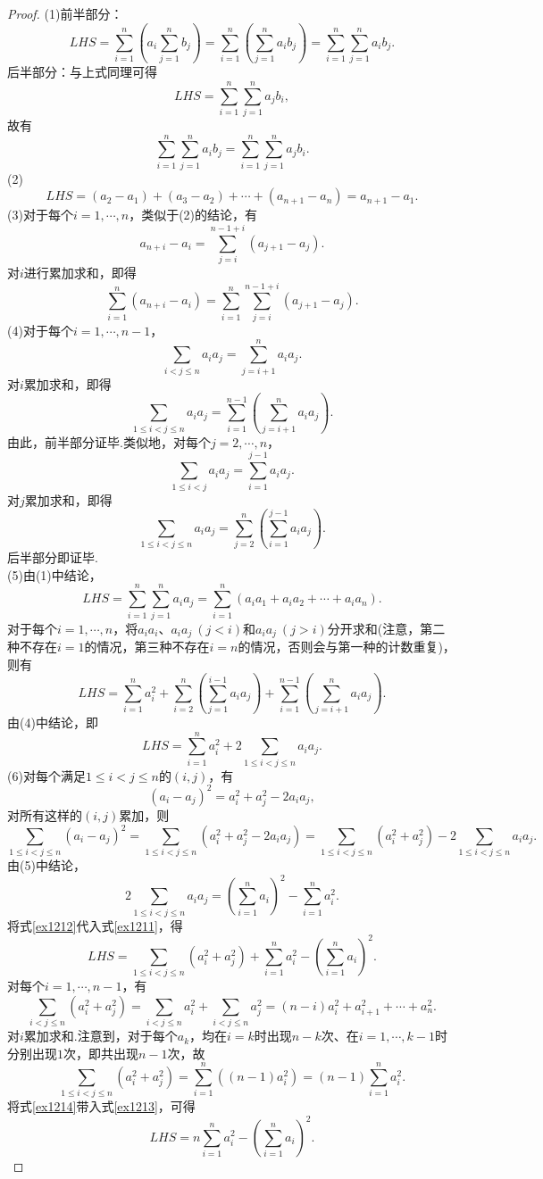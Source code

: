 \documentclass[lang=cn, zihao=5]{elegantbook}
\newcommand{\ssb}[1]{\left( #1 \right)}
\begin{document}
\begin{proof}
	(1)前半部分：$$LHS = \sum_{i=1}^{n} \ssb{a_i \sum_{j=1}^{n}b_j} = \sum_{i=1}^{n} \ssb{\sum_{j=1}^{n}a_ib_j} = \sum_{i=1}^{n}\sum_{j=1}^{n} a_ib_j.$$
	后半部分：与上式同理可得$$LHS = \sum_{i=1}^{n}\sum_{j=1}^{n} a_jb_i,$$
	故有$$\sum_{i=1}^{n}\sum_{j=1}^{n} a_ib_j = \sum_{i=1}^{n}\sum_{j=1}^{n} a_jb_i.$$
	(2)$$LHS = (a_2-a_1) + (a_3-a_2) + \cdots + (a_{n+1}-a_n) = a_{n+1}-a_1.$$
	(3)对于每个$i=1,\cdots ,n$，类似于(2)的结论，有$$a_{n+i}-a_i = \sum_{j=i}^{n-1+i}(a_{j+1}-a_j).$$
	对$i$进行累加求和，即得$$\sum_{i=1}^{n} (a_{n+i}-a_i) = \sum_{i=1}^n \sum_{j=i}^{n-1+i}(a_{j+1}-a_j).$$
	(4)对于每个$i=1, \cdots ,n-1$，$$\sum_{i<j \leq n} a_ia_j = \sum_{j=i+1}^{n} a_ia_j.$$
	对$i$累加求和，即得$$\sum_{1 \leq i < j \leq n}a_ia_j = \sum_{i=1}^{n-1} \ssb{\sum_{j=i+1}^{n} a_ia_j}.$$
	由此，前半部分证毕.类似地，对每个$j=2, \cdots ,n$，$$\sum_{1 \leq i<j} a_ia_j = \sum_{i=1}^{j-1} a_ia_j.$$
	对$j$累加求和，即得$$\sum_{1 \leq i < j \leq n}a_ia_j = \sum_{j=2}^{n} \ssb{\sum_{i=1}^{j-1} a_ia_j}.$$
	后半部分即证毕. \\
	(5)由(1)中结论，$$LHS = \sum_{i=1}^{n}\sum_{j=1}^{n} a_ia_j = \sum_{i=1}^{n} (a_ia_1+a_ia_2 + \cdots + a_ia_n).$$
	对于每个$i=1, \cdots ,n$，将$a_ia_i$、$a_ia_j~(j<i)$和$a_ia_j~(j>i)$分开求和(注意，第二种不存在$i=1$的情况，第三种不存在$i=n$的情况，否则会与第一种的计数重复)，则有$$LHS = \sum_{i=1}^{n} a_i^2 + \sum_{i=2}^{n} \ssb{\sum_{j=1}^{i-1} a_ia_j} + \sum_{i=1}^{n-1} \ssb{\sum_{j=i+1}^{n} a_ia_j}.$$
	由(4)中结论，即$$LHS = \sum_{i=1}^{n} a_i^2 + 2\sum_{1 \leq i < j \leq n}a_ia_j.$$
	(6)对每个满足$1 \leq i < j \leq n$的$(i,j)$，有$$(a_i-a_j)^2 = a_i^2+a_j^2-2a_ia_j,$$
	对所有这样的$(i,j)$累加，则
	\begin{equation}
		\sum_{1 \leq i < j \leq n}(a_i-a_j)^2 = \sum_{1 \leq i < j \leq n} (a_i^2+a_j^2-2a_ia_j) = \sum_{1 \leq i < j \leq n}(a_i^2+a_j^2) -2\sum_{1 \leq i < j \leq n} a_ia_j. \label{ex1211}
	\end{equation}
	由(5)中结论，
	\begin{equation}
		2\sum_{1 \leq i < j \leq n}a_ia_j = \ssb{\sum_{i=1}^n a_i}^2 - \sum_{i=1}^{n} a_i^2. \label{ex1212}
	\end{equation}
	将式\ref{ex1212}代入式\ref{ex1211}，得
	\begin{equation}
		LHS = \sum_{1 \leq i < j \leq n}(a_i^2+a_j^2) + \sum_{i=1}^{n} a_i^2 - \ssb{\sum_{i=1}^n a_i}^2. \label{ex1213}
	\end{equation}
	对每个$i=1, \cdots ,n-1$，有$$\sum_{i < j \leq n} (a_i^2+a_j^2) = \sum_{i < j \leq n}a_i^2 + \sum_{i < j \leq n}a_j^2 = (n-i)a_i^2 + a_{i+1}^2 + \cdots + a_n^2.$$
	对$i$累加求和.注意到，对于每个$a_k$，均在$i=k$时出现$n-k$次、在$i=1,\cdots ,k-1$时分别出现$1$次，即共出现$n-1$次，故
	\begin{equation}
		\sum_{1 \leq i < j \leq n}(a_i^2+a_j^2) = \sum_{i=1}^{n} \ssb{(n-1)a_i^2} = (n-1) \sum_{i=1}^{n} a_i^2. \label{ex1214}
	\end{equation}
	将式\ref{ex1214}带入式\ref{ex1213}，可得$$LHS = n\sum_{i=1}^{n} a_i^2 - \ssb{\sum_{i=1}^{n} a_i}^2.$$
\end{proof}
\end{document}
